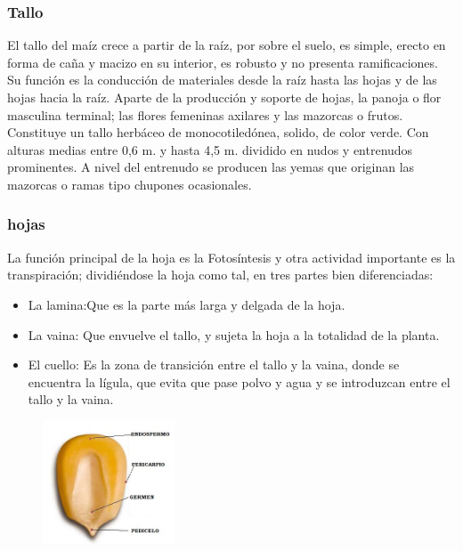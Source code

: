 \documentclass[utf8]{FrontiersinHarvard} %
\begin{document}
     \subsubsection{Tallo} 
    El tallo del maíz crece a partir de la raíz, por sobre el suelo, 
    es simple, erecto en forma de caña y macizo en su interior, 
    es robusto y no presenta ramificaciones. Su función es la conducción de 
    materiales desde la raíz hasta las hojas y de las hojas hacia la raíz. 
    Aparte de la producción y soporte de hojas, la panoja o flor masculina terminal; 
    las flores femeninas axilares y las mazorcas o frutos.
    Constituye un tallo herbáceo de monocotiledónea, solido, de color verde. 
    Con alturas medias entre 0,6 m. y hasta 4,5 m. dividido en nudos y 
    entrenudos prominentes. A nivel del entrenudo se producen las yemas que originan las mazorcas 
    o ramas tipo chupones ocasionales. 
    \subsubsection{hojas} 
    La función principal de la hoja es la Fotosíntesis y otra actividad 
    importante es la transpiración; dividiéndose la hoja como tal, 
    en tres partes bien diferenciadas:
    \begin{itemize}
        \item La lamina:Que es la parte más larga y delgada de la hoja.
        \item La vaina: Que envuelve el tallo, y sujeta la hoja a la totalidad de la planta. 
        \item El cuello: Es la zona de transición entre el tallo y la vaina, donde se encuentra la lígula, que evita que pase polvo y agua y se introduzcan entre el tallo y la vaina.
        
    \end{itemize}
       \begin{figure} %
        \centering
        \includegraphics[width=0.35\textwidth]{./images/maiz.jpg}
    \end{figure} 
\end{document}
